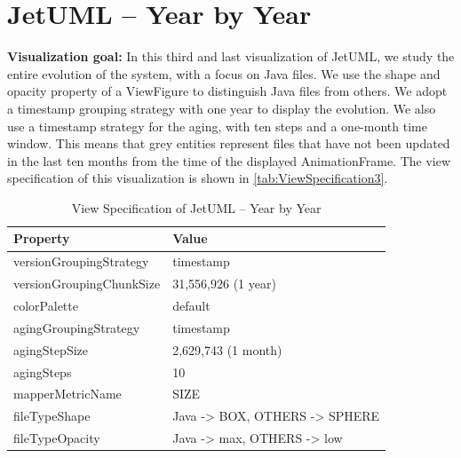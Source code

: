 \section{JetUML – Year by Year}
\noindent
\textbf{Visualization goal:}
In this third and last visualization of JetUML, we study the entire evolution of the system, with a focus on Java files. 
We use the shape and opacity property of a ViewFigure to distinguish Java files from others.
We adopt a timestamp grouping strategy with one year to display the evolution. We also use a timestamp strategy for the aging, with ten steps and a one-month time window. This means that grey entities represent files that have not been updated in the last ten months from the time of the displayed AnimationFrame. 
The view specification of this visualization is shown in \autoref{tab:ViewSpecification3}.
\begin{table}[h]
	\small
    \centering
    \begin{tabular}{@{}ll@{}} 
        \toprule
        \textbf{Property} & \textbf{Value} \\\midrule
        versionGroupingStrategy & timestamp\\ 
		versionGroupingChunkSize & 31,556,926 (1 year)\\
		colorPalette & default\\
		agingGroupingStrategy & timestamp \\
		agingStepSize & 2,629,743 (1 month) \\
		agingSteps & 10 \\
		mapperMetricName & SIZE \\
		fileTypeShape & Java -> BOX, OTHERS -> SPHERE \\
		fileTypeOpacity & Java -> max, OTHERS -> low \\\bottomrule
    \end{tabular}
    \caption{View Specification of JetUML – Year by Year}
    \label{tab:ViewSpecification3}
\end{table}

